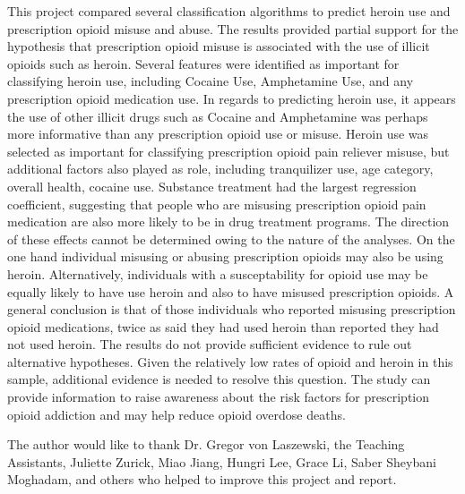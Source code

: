 \documentclass[sigconf]{acmart}
\begin{document}
This project compared several classification algorithms to predict heroin use 
and prescription opioid misuse and abuse. The results provided partial support
for the hypothesis that prescription opioid misuse is associated with the use
of illicit opioids such as heroin. Several features were identified as 
important for classifying heroin use, including Cocaine Use, Amphetamine Use, 
and any prescription opioid medication use. In regards to predicting heroin
use, it appears the use of other illicit drugs such as Cocaine and Amphetamine 
was perhaps more informative than any prescription opioid use or misuse. Heroin 
use was selected as important for classifying prescription opioid pain reliever 
misuse, but additional factors also played as role, including tranquilizer use,
age category, overall health, cocaine use. Substance treatment had the largest
regression coefficient, suggesting that people who are misusing prescription
opioid pain medication are also more likely to be in drug treatment programs. 
The direction of these effects cannot be determined owing to the nature of the 
analyses. On the one hand individual misusing or abusing prescription opioids 
may also be using heroin. Alternatively, individuals with a susceptability for 
opioid use may be equally likely to have use heroin and also to have misused 
prescription opioids. A general conclusion is that of those individuals who 
reported misusing prescription opioid medications, twice as said they had used
heroin than reported they had not used heroin. The results do not provide 
sufficient evidence to rule out alternative hypotheses. Given the relatively 
low rates of opioid and heroin in this sample, additional evidence is needed to 
resolve this question. The study can provide information to raise awareness 
about the risk factors for prescription opioid addiction and may help reduce 
opioid overdose deaths. 


\begin{acks}

The author would like to thank Dr. Gregor von Laszewski, the Teaching 
Assistants, Juliette Zurick, Miao Jiang, Hungri Lee, Grace Li, Saber Sheybani
Moghadam, and others who helped to improve this project and report.

\end{acks}


 


\appendix
\end{document}
